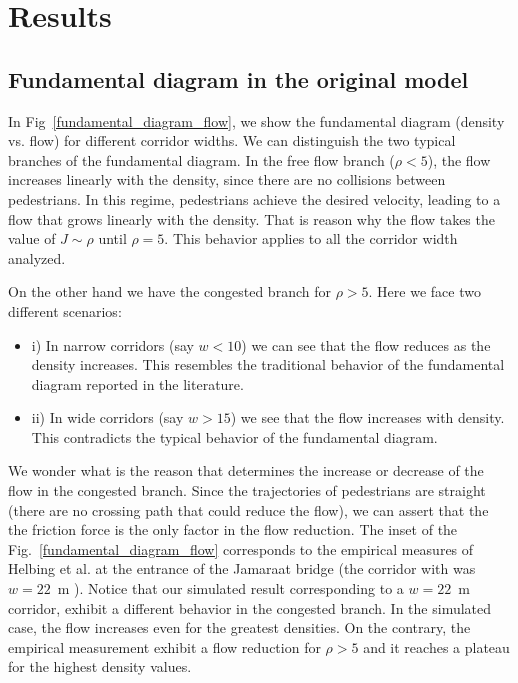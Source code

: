 \section{\label{results}Results}

\subsection{\label{fundamental_diagram} Fundamental diagram in the original model}

In Fig~\ref{fundamental_diagram_flow}, we show the fundamental diagram (density vs. flow) for different corridor widths. We can distinguish the two typical branches of the fundamental diagram. In the free flow branch ($\rho < 5$), the flow increases linearly with the density, since there are no collisions between pedestrians. In this regime, pedestrians achieve the desired velocity, leading to a flow that grows linearly with the density. That is reason why the flow takes the value of $J \sim \rho$ until $\rho=5$. This behavior applies to all the corridor width analyzed. 

On the other hand we have the congested branch  for $\rho > 5$. Here we face two different scenarios:

\begin{itemize}
\item i) In narrow corridors (say $w < 10$) we can see that the flow reduces as the density increases. This resembles the traditional behavior of the fundamental diagram reported in the literature. 
\item ii) In wide corridors (say $w > 15$) we see that the flow increases with density. This contradicts the typical behavior of the fundamental diagram.   
\end{itemize}

We wonder what is the reason that determines the increase or decrease of the flow in the congested branch. Since the trajectories of pedestrians are straight (there are no crossing path that could reduce the flow), we can assert that the the friction force is the only factor in the flow reduction. The inset of the Fig.~\ref{fundamental_diagram_flow} corresponds to the empirical measures of Helbing et al. at the entrance of the Jamaraat bridge (the corridor with was $w=22$~m ). Notice that our simulated result corresponding to a $w=22$~m corridor, exhibit a different behavior in the congested branch. In the simulated case, the flow increases even for the greatest densities. On the contrary, the empirical measurement exhibit a flow reduction for $\rho > 5$ and it reaches a plateau for the highest density values.  

